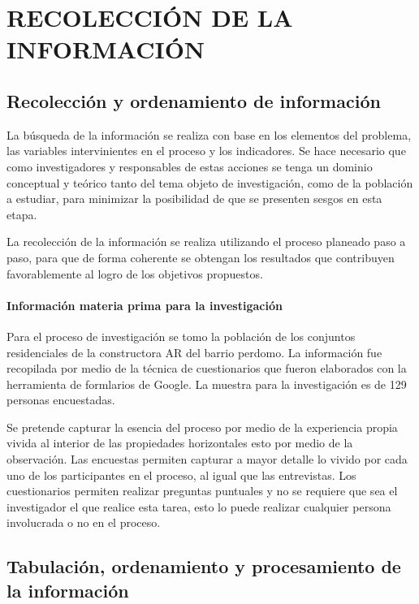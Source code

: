 \chapter{RECOLECCIÓN DE LA INFORMACIÓN}

\section{Recolección y ordenamiento de información}

La búsqueda de la información se realiza con base en los elementos del problema, las variables intervinientes en el proceso y los indicadores. Se hace necesario que como investigadores y responsables de estas acciones se tenga un dominio conceptual y teórico tanto del tema objeto de investigación, como de la población a estudiar, para minimizar la posibilidad de que se presenten sesgos en esta etapa. 

\vspace{0.5cm}

La recolección de la información se realiza utilizando el proceso planeado paso a paso, para que de forma coherente se obtengan los resultados que contribuyen favorablemente al logro de los objetivos propuestos. 

\subsubsection{Información materia prima para la investigación}

Para el proceso de investigación se tomo la población de los conjuntos residenciales de la constructora AR del barrio perdomo. La información fue recopilada por medio de la técnica de cuestionarios que fueron elaborados con la herramienta de formlarios de Google. La muestra para la investigación es de 129 personas encuestadas.

\vspace{0.5cm}

Se pretende capturar la esencia del proceso por medio de la experiencia propia vivida al interior de las propiedades horizontales esto por medio de la observación. Las encuestas permiten capturar a mayor detalle lo vivido por cada uno de los participantes en el proceso, al igual que las entrevistas. Los cuestionarios permiten realizar preguntas puntuales y no se requiere que sea el investigador el que realice esta tarea, esto lo puede realizar cualquier persona involucrada o no en el proceso.


\section{Tabulación, ordenamiento y procesamiento de la información}

